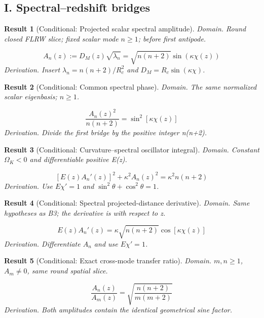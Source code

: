 \documentclass[aps,prd,onecolumn,notitlepage,groupedaddress,11pt]{revtex4-2}
\newtheorem{result}{Result}
\begin{document}
\subsection{I. Spectral--redshift bridges}
\begin{result}[\textsf{Conditional}: Projected scalar spectral amplitude]\label{bridge:1}
\textit{Domain.} Round closed FLRW slice; fixed scalar mode \(n\ge1\); before first antipode.\par
\begin{equation}\label{bridgeeq:1}
A_n(z):=D_M(z)\sqrt{\lambda_n}=\sqrt{n(n+2)}\sin(\kappa\chi(z))
\end{equation}
\textit{Derivation.} Insert \(\lambda_n=n(n+2)/R_c^2\) and \(D_M=R_c\sin(\kappa\chi)\).
\end{result}
\begin{result}[\textsf{Conditional}: Common spectral phase]\label{bridge:2}
\textit{Domain.} The same normalized scalar eigenbasis; \(n\ge1\).\par
\begin{equation}\label{bridgeeq:2}
\frac{A_n(z)^2}{n(n+2)}=\sin^2[\kappa\chi(z)]
\end{equation}
\textit{Derivation.} Divide the first bridge by the positive integer n(n+2).
\end{result}
\begin{result}[\textsf{Conditional}: Curvature--spectral oscillator integral]\label{bridge:3}
\textit{Domain.} Constant \(\Omega_K<0\) and differentiable positive E(z).\par
\begin{equation}\label{bridgeeq:3}
[E(z)A_n\prime(z)]^2+\kappa^2 A_n(z)^2=\kappa^2n(n+2)
\end{equation}
\textit{Derivation.} Use \(E\chi\prime=1\) and \(\sin^2\theta+\cos^2\theta=1\).
\end{result}
\begin{result}[\textsf{Conditional}: Spectral projected-distance derivative]\label{bridge:4}
\textit{Domain.} Same hypotheses as B3; the derivative is with respect to z.\par
\begin{equation}\label{bridgeeq:4}
E(z)A_n\prime(z)=\kappa\sqrt{n(n+2)}\cos[\kappa\chi(z)]
\end{equation}
\textit{Derivation.} Differentiate \(A_n\) and use \(E\chi\prime=1\).
\end{result}
\begin{result}[\textsf{Conditional}: Exact cross-mode transfer ratio]\label{bridge:5}
\textit{Domain.} \(m,n\ge1\), \(A_m\ne0\), same round spatial slice.\par
\begin{equation}\label{bridgeeq:5}
\frac{A_n(z)}{A_m(z)}=\sqrt{\frac{n(n+2)}{m(m+2)}}
\end{equation}
\textit{Derivation.} Both amplitudes contain the identical geometrical sine factor.
\end{result}
\end{document}
